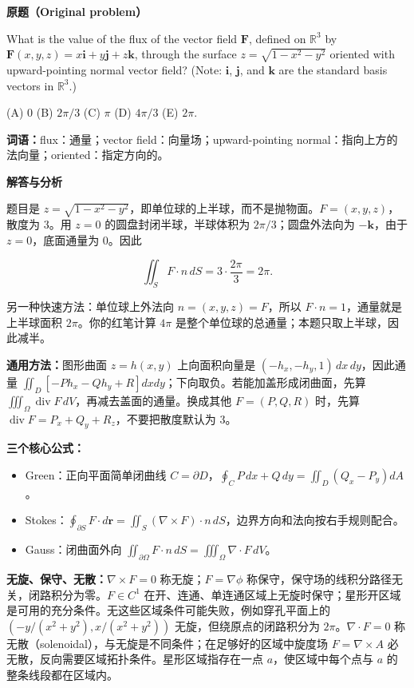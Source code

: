\documentclass[11pt,a4paper,fontset=fandol]{ctexart}
\providecommand{\tightlist}{\setlength{\itemsep}{0pt}\setlength{\parskip}{0pt}}
\begin{document}
\textbf{原题（Original problem）}\par
What is the value of the flux of the vector field $\mathbf F$, defined on $\mathbb R^3$ by $\mathbf F(x,y,z)=x\mathbf i+y\mathbf j+z\mathbf k$, through the surface $z=\sqrt{1-x^2-y^2}$ oriented with upward-pointing normal vector field? (Note: $\mathbf i$, $\mathbf j$, and $\mathbf k$ are the standard basis vectors in $\mathbb R^3$.)

(A) $0$ \quad (B) $2\pi/3$ \quad (C) $\pi$ \quad (D) $4\pi/3$ \quad (E) $2\pi$.

\textbf{词语：}flux：通量；vector field：向量场；upward-pointing normal：指向上方的法向量；oriented：指定方向的。

\textbf{解答与分析}\par


题目是
\(z=\sqrt{1-x^2-y^2}\)，即单位球的上半球，而不是抛物面。\(F=(x,y,z)\)，散度为
3。用 \(z=0\) 的圆盘封闭半球，半球体积为 \(2\pi/3\)；圆盘外法向为
\(-\mathbf k\)，由于 \(z=0\)，底面通量为 0。因此

\[\iint_S F\cdot n\,dS=3\cdot\frac{2\pi}{3}=2\pi.\]

另一种快速方法：单位球上外法向 \(n=(x,y,z)=F\)，所以
\(F\cdot n=1\)，通量就是上半球面积 \(2\pi\)。你的红笔计算 \(4\pi\)
是整个单位球的总通量；本题只取上半球，因此减半。

\textbf{通用方法：}图形曲面 \(z=h(x,y)\) 上向面积向量是
\((-h_x,-h_y,1)\,dx\,dy\)，因此通量
\(\iint_D[-P h_x-Q h_y+R]dxdy\)；下向取负。若能加盖形成闭曲面，先算
\(\iiint_\Omega\operatorname{div}F\,dV\)，再减去盖面的通量。换成其他
\(F=(P,Q,R)\) 时，先算
\(\operatorname{div}F=P_x+Q_y+R_z\)，不要把散度默认为 3。

\textbf{三个核心公式：}

\begin{itemize}
\tightlist
\item
  Green：正向平面简单闭曲线
  \(C=\partial D\)，\(\oint_C P\,dx+Q\,dy=\iint_D(Q_x-P_y)dA\)。
\item
  Stokes：\(\oint_{\partial S}F\cdot d\mathbf r=\iint_S(\nabla\times F)\cdot n\,dS\)，边界方向和法向按右手规则配合。
\item
  Gauss：闭曲面外向
  \(\iint_{\partial\Omega}F\cdot n\,dS=\iiint_\Omega\nabla\cdot F\,dV\)。
\end{itemize}

\textbf{无旋、保守、无散：}\(\nabla\times F=0\) 称无旋；\(F=\nabla\phi\)
称保守，保守场的线积分路径无关，闭路积分为零。\(F\in C^1\)
在开、连通、单连通区域上无旋时保守；星形开区域是可用的充分条件。无这些区域条件可能失败，例如穿孔平面上的
\((-y/(x^2+y^2),x/(x^2+y^2))\) 无旋，但绕原点的闭路积分为
\(2\pi\)。\(\nabla\cdot F=0\)
称无散（solenoidal），与无旋是不同条件；在足够好的区域中旋度场
\(F=\nabla\times A\) 必无散，反向需要区域拓扑条件。星形区域指存在一点
\(a\)，使区域中每个点与 \(a\) 的整条线段都在区域内。
\end{document}
